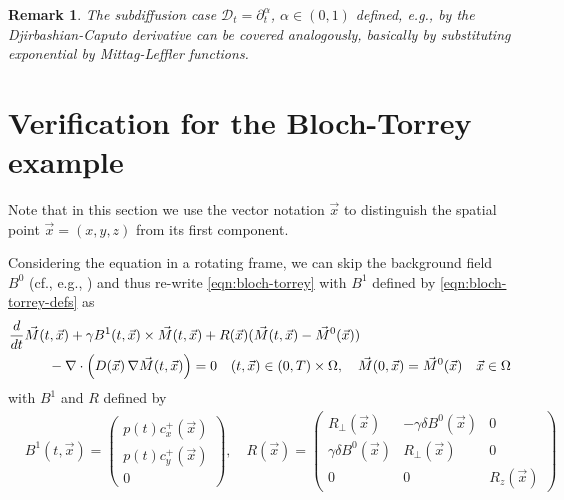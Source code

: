\documentclass[12pt]{article}
\newtheorem{remark}[theorem]{Remark}
\newcommand\skipgradient[1]{}
\newcommand\DD{\mathcal{D}}
\newcommand\vecr{\vec{x}}
\begin{document}
\begin{remark}\label{rem:frac}
The subdiffusion case $\DD_t=\partial_t^\alpha$, $\alpha\in(0,1)$ defined, e.g., by the Djirbashian-Caputo derivative can be covered analogously, basically by substituting exponential by Mittag-Leffler functions. 
\end{remark}


\section{Verification for the Bloch-Torrey example}\label{sec:BT}
Note that in this section we use the vector notation $\vecr$ to distinguish the spatial point $\vecr=(x,y,z)$ from its first component.

Considering the equation in a rotating frame, we can skip the background field $B^0$ (cf., e.g., \cite{MRI-uniqueness}) and thus re-write \eqref{eqn:bloch-torrey} with $B^1$ defined by \eqref{eqn:bloch-torrey-defs} as
\begin{equation}\label{eqn:bloch-torrey-rot}
\begin{aligned}
&    \frac{d}{dt} \vec M(t, \vecr) + \gamma B^1(t, \vecr)\times\vec M(t, \vecr)    
+ R(\vecr) ({\vec M}(t, \vecr)-{\vec M}^0(\vecr))
\\&\hspace*{1cm}
    -\nabla\cdot\Bigl(D(\vecr) \, \nabla \vec M(t, \vecr)\Bigr)
=0\quad (t,\vecr)\in (0,T)\times\Omega, \quad
{\vec M}(0, \vecr)={\vec M}^0(\vecr)\quad \vecr\in \Omega
\end{aligned}
\end{equation}
with $B^1$ and $R$ defined by 
\begin{equation}\label{eqn:bloch-torrey-rot-defs}
\begin{aligned}
&B^1(t, \vecr)=
\begin{pmatrix} p(t)c^+_{x}(\vecr)\\p(t)c^+_{y}(\vecr)\\ 0\skipgradient{\gamma\vec{g}(t)\cdot\vecr}
\end{pmatrix},
\quad 
R(\vecr)=
\begin{pmatrix}
R_\perp(\vecr)&-\gamma\delta B^0(\vecr)&0\\
\gamma\delta B^0(\vecr)&R_\perp(\vecr)&0\\
0&0&R_z(\vecr)
\end{pmatrix}
\end{aligned}
\end{equation}
\end{document}
